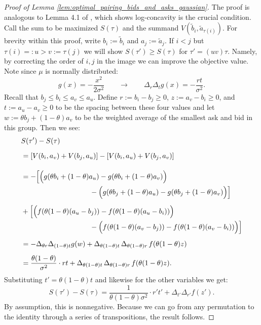 \documentclass[11pt]{article}
\theoremstyle{plain}
\theoremstyle{definition}
\numberwithin{equation}{section}
\begin{document}
\begin{proof}[Proof of Lemma \ref{lem:optimal_pairing_bids_and_asks_gaussian}]
    The proof is analogous to Lemma 4.1 of \cite{bobkov2009_one_dimensional_measures_kantorovich}, which shows log-concavity is the crucial condition. Call the sum to be maximized $S(\tau)$ and the summand $V(\widetilde b_i,\widetilde a_{\tau(i)})$. For brevity within this proof, write $b_i:=\widetilde b_i$ and $a_j:=\widetilde a_j$. If $i < j$ but $\tau(i) =: u > v := \tau(j)$ we will show $S(\tau') \geq S(\tau)$ for $\tau' = (uv) \tau$. Namely, by correcting the order of $i,j$ in the image we can improve the objective value. Note since $\mu$ is normally distributed:
    \[ g(x) = -\frac{x^2}{2\sigma^2} \qquad \to \qquad  \Delta_r \Delta_t g(x) = - \frac{rt}{\sigma^2}. \]
    \noindent  Recall that $b_j \leq b_i \leq a_v \leq a_u$. Define $r := b_i - b_j \geq 0$, $z := a_v - b_i \geq 0$, and $t := a_u - a_v \geq 0$ to be the spacing between these four values and let $w := \theta b_j + (1-\theta)a_v$ to be the weighted average of the smallest ask and bid in this group. Then we see:
    \begin{align*}
        & S(\tau') - S(\tau) \\[6pt]
        & = \left[ V(b_i, a_v) + V(b_j, a_u) \right] - \left[ V(b_i, a_u) + V(b_j, a_v) \right] \\[1em]
        & = - \Big[ \Big(g(\theta b_i + (1-\theta) a_u) - g(\theta b_i + (1-\theta) a_v) \Big) \\
        &\hspace{3.4cm} - \Big(g(\theta b_j + (1-\theta) a_u) - g(\theta b_j + (1-\theta) a_v) \Big) \Big] \\[5pt]
        & + \Big[ \Big(f(\theta(1-\theta)(a_u - b_j)) - f(\theta(1-\theta)(a_u - b_i)) \Big) \\
        &\hspace{3.4cm} - \Big(f(\theta(1-\theta)(a_v - b_j)) - f(\theta(1-\theta)(a_v - b_i)) \Big) \Big] \\[5pt]
        & = -\Delta_{\theta r} \Delta_{(1-\theta)t} g(w) + \Delta_{\theta(1-\theta) t} \, \Delta_{\theta(1-\theta) r} \, f(\theta(1-\theta) z) \\[5pt]
        & = \frac{\theta (1-\theta)}{\sigma^2} \cdot rt + \Delta_{\theta(1-\theta) t} \, \Delta_{\theta(1-\theta) r} \, f(\theta(1-\theta) z).
    \end{align*}
    \noindent Substituting $t' = \theta(1-\theta)t$ and likewise for the other variables we get:
    \[S(\tau') - S(\tau) = \frac{1}{\theta(1-\theta)\sigma^2} \cdot r't' + \Delta_{t'} \Delta_{r'} f(z').\]
    \noindent By assumption, this is nonnegative. Because we can go from any permutation to the identity through a series of transpositions, the result follows.
\end{proof}
\end{document}

